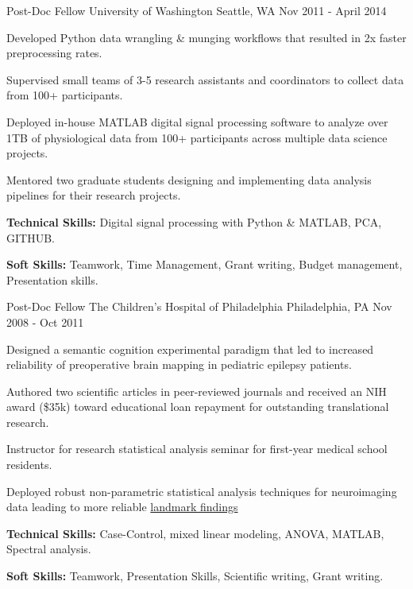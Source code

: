\begin{cventries}
  \cventry
  {Post-Doc Fellow} %
  {University of Washington} %
  {Seattle, WA} %
  {Nov 2011 - April 2014} %
  {
    \begin{cvitems} %
      \item {Developed Python data wrangling \& munging workflows that resulted in 2x faster  preprocessing rates.}
      \item {Supervised small teams of 3-5 research assistants and coordinators to collect data from 100+ participants.} %
      \item {Deployed in-house MATLAB digital signal processing software to analyze over 1TB of physiological data from 100+ participants across multiple data science projects.}
      \item {Mentored two graduate students designing and implementing data analysis pipelines for their research projects.}
      \item {\textbf{Technical Skills:} Digital signal processing with Python \& MATLAB, PCA, GITHUB.}
      \item {\textbf{Soft Skills:} Teamwork, Time Management, Grant writing, Budget management, Presentation skills.}
    \end{cvitems}
  }

  \cventry
  {Post-Doc Fellow} %
  {The Children's Hospital of Philadelphia} %
  {Philadelphia, PA} %
  {Nov 2008 - Oct 2011} %
  {
    \begin{cvitems} %
      \item {Designed a semantic cognition experimental paradigm that led to increased reliability of preoperative brain mapping in pediatric epilepsy patients.}
      \item {Authored two scientific articles in peer-reviewed journals and received an NIH award (\$35k) toward educational loan repayment for outstanding translational research.} 
      \item {Instructor for research statistical analysis seminar for first-year medical school residents.}
      \item {Deployed robust non-parametric statistical analysis techniques for neuroimaging data leading to more reliable \href{https://doi.org/10.1016/j.biopsych.2011.01.015}{landmark findings}}
      \item {\textbf{Technical Skills:} Case-Control, mixed linear modeling, ANOVA, MATLAB, Spectral analysis.}
      \item {\textbf{Soft Skills:} Teamwork, Presentation Skills, Scientific writing, Grant writing.}
    \end{cvitems}
  }


\end{cventries}
